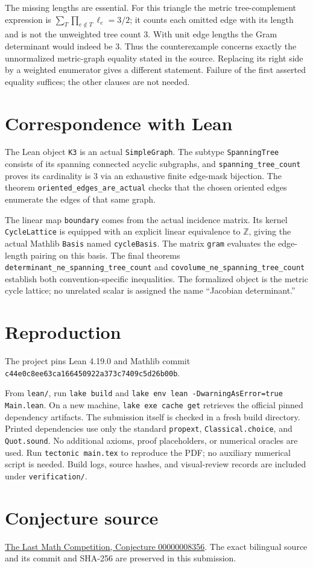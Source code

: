 \documentclass[11pt]{article}
\newcommand{\Z}{\mathbb Z}
\begin{document}
The missing lengths are essential. For this triangle the metric
tree-complement expression is
$\sum_T\prod_{e\notin T}\ell_e=3/2$; it counts each omitted edge
with its length and is not the unweighted tree count $3$.
With unit edge lengths the Gram determinant would indeed be $3$.
Thus the counterexample concerns exactly the unnormalized metric-graph
equality stated in the source. Replacing its right side by a weighted
enumerator gives a different statement. Failure of the first asserted
equality suffices; the other clauses are not needed.

\section*{Correspondence with Lean}
The Lean object \texttt{K3} is an actual \texttt{SimpleGraph}.
The subtype \texttt{SpanningTree} consists of its spanning connected
acyclic subgraphs, and \texttt{spanning\_\allowbreak{}tree\_\allowbreak{}count} proves its
cardinality is $3$ via an exhaustive finite edge-mask bijection.
The theorem \texttt{oriented\_\allowbreak{}edges\_\allowbreak{}are\_\allowbreak{}actual} checks that the
chosen oriented edges enumerate the edges of that same graph.

The linear map \texttt{boundary} comes from the actual incidence
matrix. Its kernel \texttt{CycleLattice} is equipped with an explicit
linear equivalence to $\Z$, giving the actual Mathlib
\texttt{Basis} named \texttt{cycleBasis}. The matrix \texttt{gram}
evaluates the edge-length pairing on this basis.
The final theorems \texttt{determinant\_\allowbreak{}ne\_\allowbreak{}spanning\_\allowbreak{}tree\_\allowbreak{}count}
and \texttt{covolume\_\allowbreak{}ne\_\allowbreak{}spanning\_\allowbreak{}tree\_\allowbreak{}count} establish both
convention-specific inequalities. The formalized object is the
metric cycle lattice; no unrelated scalar is assigned the name
``Jacobian determinant.''

\section*{Reproduction}
The project pins Lean 4.19.0 and Mathlib commit
\\\texttt{c44e0c8ee63ca166450922a373c7409c5d26b00b}.\par
From \texttt{lean/}, run \texttt{lake build} and
\texttt{lake env lean -DwarningAsError=true Main.lean}.
On a new machine, \texttt{lake exe cache get} retrieves the official
pinned dependency artifacts. The submission itself is checked in a fresh
build directory. Printed dependencies use only the standard
\texttt{propext}, \texttt{Classical.choice}, and \texttt{Quot.sound}.
No additional axioms, proof placeholders, or numerical oracles are used.
Run \texttt{tectonic main.tex} to reproduce the PDF; no auxiliary numerical
script is needed. Build logs, source hashes, and visual-review records
are included under \texttt{verification/}.
\section*{Conjecture source}
\href{https://github.com/The-Last-Math-Competition/The-Last-Math-Competition/blob/main/conjectures/00000008356.md}{The Last Math Competition, Conjecture 00000008356}. The exact bilingual source and its commit and SHA-256 are preserved in this submission.
\end{document}
